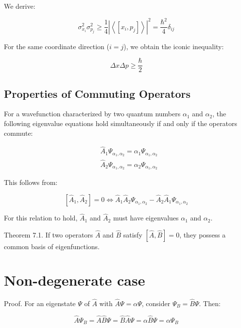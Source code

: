 \documentclass[italian]{HKNdocument}
\begin{document}
We derive:

\begin{equation}
\sigma_{x_{i}}^{2} \sigma_{p_{j}}^{2} \geq \frac{1}{4}\left|\left\langle\left[x_{i}, p_{j}\right]\right\rangle\right|^{2}=\frac{\hbar^{2}}{4} \delta_{i j} \label{eq:7.19}
\end{equation}

For the same coordinate direction ($i=j$), we obtain the iconic inequality:

\begin{equation}
\Delta x \Delta p \geq \frac{\hbar}{2} \label{eq:7.20}
\end{equation}

\subsection{Properties of Commuting Operators}
For a wavefunction characterized by two quantum numbers $\alpha_1$ and $\alpha_2$, the following eigenvalue equations hold simultaneously if and only if the operators commute:

\begin{align}
& \hat{A}_{1} \Psi_{\alpha_{1}, \alpha_{2}}=\alpha_{1} \Psi_{\alpha_{1}, \alpha_{2}} \\
& \hat{A}_{2} \Psi_{\alpha_{1}, \alpha_{2}}=\alpha_{2} \Psi_{\alpha_{1}, \alpha_{2}} \label{eq:7.21}
\end{align}

This follows from:

\begin{equation}
\left[\hat{A}_{1}, \hat{A}_{2}\right]=0 \Longleftrightarrow \hat{A}_{1} \hat{A}_{2} \Psi_{\alpha_{1}, \alpha_{2}}-\hat{A}_{2} \hat{A}_{1} \Psi_{\alpha_{1}, \alpha_{2}} \label{eq:7.22}
\end{equation}

For this relation to hold, $\hat{A}_1$ and $\hat{A}_2$ must have eigenvalues $\alpha_1$ and $\alpha_2$.

Theorem 7.1. If two operators $\hat{A}$ and $\hat{B}$ satisfy $[\hat{A}, \hat{B}]=0$, they possess a common basis of eigenfunctions.

\section{Non-degenerate case}
Proof. For an eigenstate $\Psi$ of $\hat{A}$ with $\hat{A} \Psi=\alpha \Psi$, consider $\Psi_{B}=\hat{B} \Psi$. Then:

\begin{equation}
\hat{A} \Psi_{B}=\hat{A} \hat{B} \Psi=\hat{B} \hat{A} \Psi=\alpha \hat{B} \Psi=\alpha \Psi_{B} \label{eq:7.23}
\end{equation}
\end{document}
